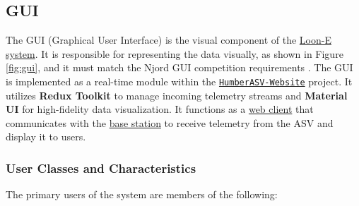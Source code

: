 %
%
%
%

\subsection{GUI}
\label{sec:gui}

The GUI (Graphical User Interface) is the visual component of the \hyperref[sec:software-overview]{Loon-E system}.
It is responsible for representing the data visually, as shown in Figure \ref{fig:gui}, and it must match the Njord GUI competition requirements \autocite{NJORDGUI}.
The GUI is implemented as a real-time module within the \hyperref[sec:website]{\texttt{HumberASV-Website}} project. It utilizes \textbf{Redux Toolkit} to manage incoming telemetry streams and \textbf{Material UI} for high-fidelity data visualization. It functions as a \hyperref[itm:webclient]{web client} that communicates with the \hyperref[sec:basestation]{base station} to receive telemetry from the ASV and display it to users.

\subsubsection{User Classes and Characteristics}
The primary users of the system are members of the following:

